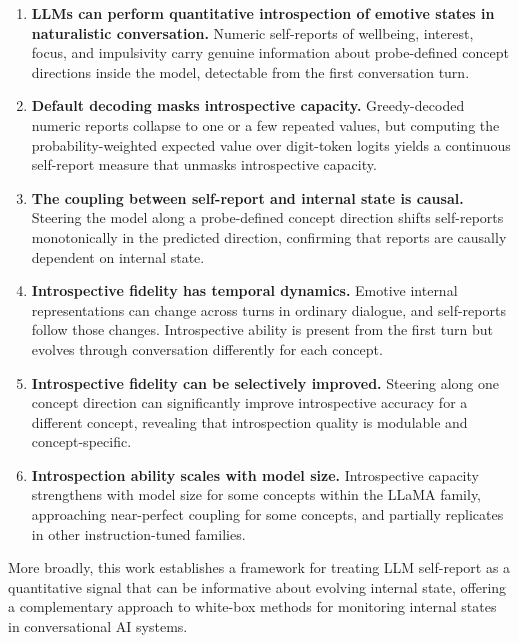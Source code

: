 \documentclass[10pt]{article}
\begin{document}
\begin{enumerate}
  \item \textbf{LLMs can perform quantitative introspection of emotive states in naturalistic conversation.} Numeric self-reports of wellbeing, interest, focus, and impulsivity carry genuine information about probe-defined concept directions inside the model, detectable from the first conversation turn.

  \item \textbf{Default decoding masks introspective capacity.} Greedy-decoded numeric reports collapse to one or a few repeated values, but computing the probability-weighted expected value over digit-token logits yields a continuous self-report measure that unmasks introspective capacity.

  \item \textbf{The coupling between self-report and internal state is causal.} Steering the model along a probe-defined concept direction shifts self-reports monotonically in the predicted direction, confirming that reports are causally dependent on internal state.

  \item \textbf{Introspective fidelity has temporal dynamics.} Emotive internal representations can change across turns in ordinary dialogue, and self-reports follow those changes. Introspective ability is present from the first turn but evolves through conversation differently for each concept.

  \item \textbf{Introspective fidelity can be selectively improved.} Steering along one concept direction can significantly improve introspective accuracy for a different concept, revealing that introspection quality is modulable and concept-specific.

  \item \textbf{Introspection ability scales with model size.} Introspective capacity strengthens with model size for some concepts within the LLaMA family, approaching near-perfect coupling for some concepts, and partially replicates in other instruction-tuned families.
\end{enumerate}

More broadly, this work establishes a framework for treating LLM self-report as a quantitative signal that can be informative about evolving internal state, offering a complementary approach to white-box methods for monitoring internal states in conversational AI systems.

\end{document}
